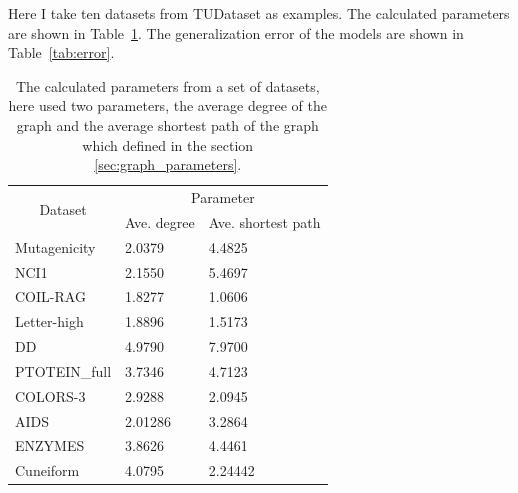 \documentclass{article}
\begin{document}
Here I take ten datasets from TUDataset as examples. The calculated parameters are shown in Table~\ref{tab:parameter}. The generalization error of the models are shown in Table~\ref{tab:error}. 


\begin{table}[h!]
    \centering
    \begin{tabular}{@{}lll@{}}
    \toprule
    \multicolumn{1}{c}{\multirow{2}{*}{Dataset}} & \multicolumn{2}{c}{Parameter}                                            \\ \cmidrule(l){2-3} 
    \multicolumn{1}{c}{}                         & \multicolumn{1}{c}{Ave. degree} & \multicolumn{1}{c}{Ave. shortest path} \\ \midrule
    Mutagenicity                                 & 2.0379         & 4.4825                     \\
    NCI1                                         & 2.1550         & 5.4697                     \\
    COIL-RAG                                     & 1.8277         & 1.0606                     \\
    Letter-high                                  & 1.8896         & 1.5173                     \\
    DD                                           & 4.9790         & 7.9700                     \\
    PTOTEIN\_full                                & 3.7346         & 4.7123                     \\
    COLORS-3                                     & 2.9288         & 2.0945                     \\ 

    AIDS  &  2.01286  & 3.2864 \\
    ENZYMES  &  3.8626  & 4.4461 \\
    Cuneiform  &  4.0795  & 2.24442 \\ \bottomrule

    \end{tabular}
    \caption{The calculated parameters from a set of datasets, here used two parameters, the average degree of the graph and the average shortest path of the graph which defined in the section \ref{sec:graph_parameters}.}
    \label{tab:parameter}
\end{table}
\end{document}
